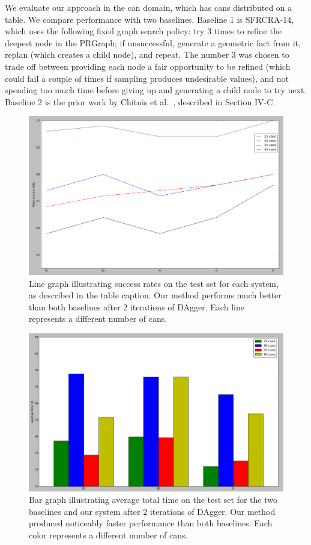 We evaluate our approach in the can domain, which has cans distributed on a table. We
compare performance with two baselines. Baseline 1 is SFRCRA-14, which uses the
following fixed graph search policy: try 3 times to refine the deepest
node in the PRGraph; if unsuccessful, generate a geometric fact from it, replan (which
creates a child node), and repeat. The number 3 was chosen to trade off between providing
each node a fair opportunity to be refined (which could fail a couple of times if sampling produces
undesirable values), and not spending too much time before giving up and generating a child node to try next.
Baseline 2 is the prior work by Chitnis et al.~\cite{chitnis2015mlpc}, described in Section IV-C.

\begin{figure}[h]
  \centering
    \includegraphics[scale=0.18]{images/results_succ.png}
  \caption{\small{Line graph illustrating success rates on the test set for each
system, as described in the table caption. Our method performs much better
than both baselines after 2 iterations of DAgger. Each line represents a different number of cans.}}
  \label{fig:results_succ}
\end{figure}

\begin{figure}[h]
  \centering
    \includegraphics[scale=0.18]{images/results_time.png}
  \caption{\small{Bar graph illustrating average total time on the test set for the
two baselines and our system after 2 iterations of DAgger. Our method produced noticeably faster
performance than both baselines. Each color represents a different number of cans.}}
  \label{fig:results_time}
\end{figure}


